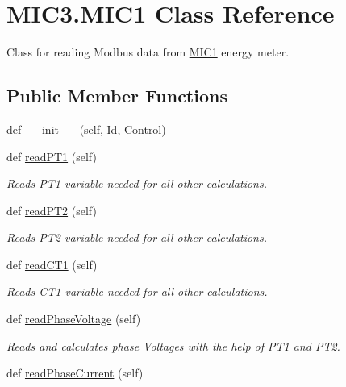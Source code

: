 \hypertarget{class_m_i_c3_1_1_m_i_c1}{}\section{M\+I\+C3.\+M\+I\+C1 Class Reference}
\label{class_m_i_c3_1_1_m_i_c1}


Class for reading Modbus data from \hyperlink{class_m_i_c3_1_1_m_i_c1}{M\+I\+C1} energy meter.  


\subsection*{Public Member Functions}
\begin{DoxyCompactItemize}
\item 
def \hyperlink{class_m_i_c3_1_1_m_i_c1_a4da84973f93568b4d4434906a2290d39}{\+\_\+\+\_\+init\+\_\+\+\_\+} (self, Id, Control)
\item 
def \hyperlink{class_m_i_c3_1_1_m_i_c1_a452c39aafd6a6091eb4a6d1f96cfc159}{read\+P\+T1} (self)
\begin{DoxyCompactList}\small\item\em Reads P\+T1 variable needed for all other calculations. \end{DoxyCompactList}\item 
def \hyperlink{class_m_i_c3_1_1_m_i_c1_a965d6b2d1f557741c6361814f7b7be3f}{read\+P\+T2} (self)
\begin{DoxyCompactList}\small\item\em Reads P\+T2 variable needed for all other calculations. \end{DoxyCompactList}\item 
def \hyperlink{class_m_i_c3_1_1_m_i_c1_a09827187550f80e18fae9d5684925dae}{read\+C\+T1} (self)
\begin{DoxyCompactList}\small\item\em Reads C\+T1 variable needed for all other calculations. \end{DoxyCompactList}\item 
def \hyperlink{class_m_i_c3_1_1_m_i_c1_a8a192d8b14144c07ce83081d88541432}{read\+Phase\+Voltage} (self)
\begin{DoxyCompactList}\small\item\em Reads and calculates phase Voltages with the help of P\+T1 and P\+T2. \end{DoxyCompactList}\item 
def \hyperlink{class_m_i_c3_1_1_m_i_c1_a0972a5f5492a0c9845d28063214a1882}{read\+Phase\+Current} (self)

\end{DoxyCompactItemize}
